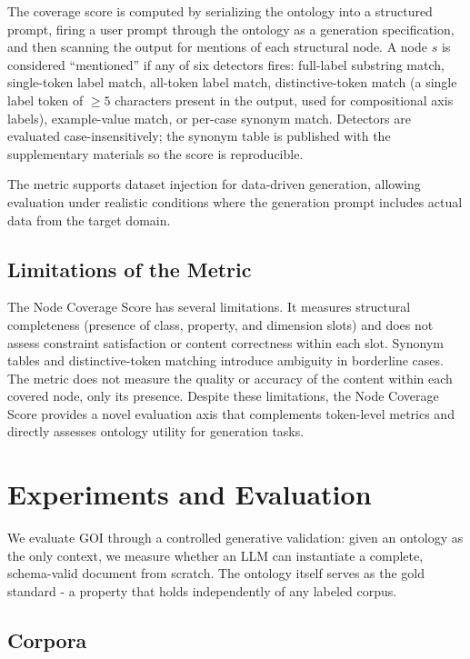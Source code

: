 \documentclass[runningheads,a4paper]{llncs}
\begin{document}
The coverage score is computed by serializing the ontology into a
structured prompt, firing a user prompt through the ontology as a
generation specification, and then scanning the output for mentions of
each structural node. A node $s$ is considered ``mentioned'' if any of
six detectors fires: full-label substring match, single-token label
match, all-token label match, distinctive-token match (a single label
token of $\geq 5$ characters present in the output, used for
compositional axis labels), example-value match, or per-case
synonym match. Detectors are evaluated case-insensitively; the
synonym table is published with the supplementary materials so the
score is reproducible.

The metric supports dataset injection for data-driven generation,
allowing evaluation under realistic conditions where the generation
prompt includes actual data from the target domain.

\subsection{Limitations of the Metric}

The Node Coverage Score has several limitations. It measures
structural completeness (presence of class, property, and dimension
slots) and does not assess constraint satisfaction or content
correctness within each slot. Synonym tables and distinctive-token
matching introduce ambiguity in borderline cases. The metric does not
measure the quality or accuracy of the content within each covered
node, only its presence. Despite these limitations, the Node Coverage
Score provides a novel evaluation axis that complements token-level
metrics and directly assesses ontology utility for generation tasks.

\section{Experiments and Evaluation}
\label{sec:experiments}

We evaluate GOI through a controlled generative validation: given an
ontology as the only context, we measure whether an LLM can instantiate
a complete, schema-valid document from scratch. The ontology itself
serves as the gold standard - a property that holds independently of
any labeled corpus.

\subsection{Corpora}
\label{subsec:corpora}
\end{document}
